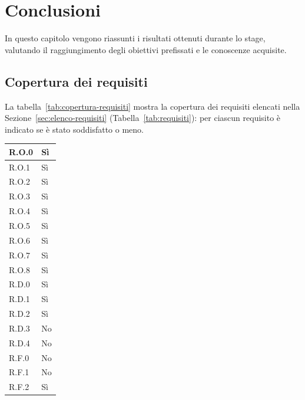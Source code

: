 \chapter{Conclusioni}
\label{chap:conclusioni}
In questo capitolo vengono riassunti i risultati ottenuti durante lo stage, valutando il raggiungimento degli obiettivi prefissati e le conoscenze acquisite.

\section{Copertura dei requisiti}
La tabella~\ref{tab:copertura-requisiti} mostra la copertura dei requisiti elencati nella Sezione~\ref{sec:elenco-requisiti} (Tabella~\ref{tab:requisiti}): per ciascun requisito è indicato se è stato soddisfatto o meno.

{
\centering
\renewcommand{\arraystretch}{1.2}
\vspace{0.5cm}
\tablelasttail{\hline}

\begin{supertabular}{|p{2.75cm}|p{2.75cm}|}
\hline
R.O.0 & Sì \\ \hline
R.O.1 & Sì \\ \hline
R.O.2 & Sì \\ \hline
R.O.3 & Sì \\ \hline
R.O.4 & Sì \\ \hline
R.O.5 & Sì \\ \hline
R.O.6 & Sì \\ \hline
R.O.7 & Sì \\ \hline
R.O.8 & Sì \\ \hline
R.D.0 & Sì \\ \hline
R.D.1 & Sì \\ \hline
R.D.2 & Sì \\ \hline
R.D.3 & No \\ \hline
R.D.4 & No \\ \hline
R.F.0 & No \\ \hline
R.F.1 & No \\ \hline
R.F.2 & Sì \\ \hline
\end{supertabular}

\par
}

